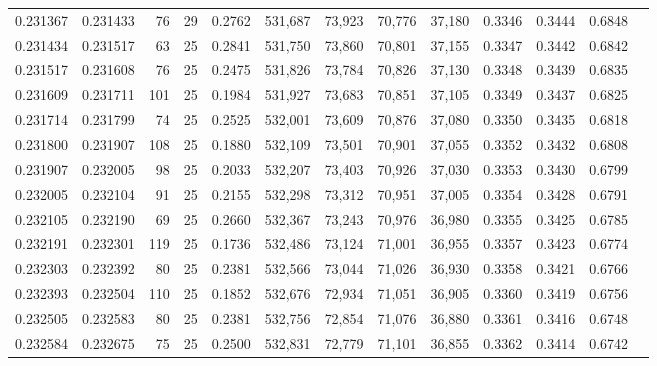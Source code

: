 \begin{tabular}{rrrrrrrrrrrrr}
0.231367 & 0.231433 &    76 &  29 &                                     0.2762 & 531,687 &  73,923 &  70,776 &  37,180 & 0.3346 & 0.3444 & 0.6848 \\
0.231434 & 0.231517 &    63 &  25 &                                     0.2841 & 531,750 &  73,860 &  70,801 &  37,155 & 0.3347 & 0.3442 & 0.6842 \\
0.231517 & 0.231608 &    76 &  25 &                                     0.2475 & 531,826 &  73,784 &  70,826 &  37,130 & 0.3348 & 0.3439 & 0.6835 \\
0.231609 & 0.231711 &   101 &  25 &                                     0.1984 & 531,927 &  73,683 &  70,851 &  37,105 & 0.3349 & 0.3437 & 0.6825 \\
0.231714 & 0.231799 &    74 &  25 &                                     0.2525 & 532,001 &  73,609 &  70,876 &  37,080 & 0.3350 & 0.3435 & 0.6818 \\
0.231800 & 0.231907 &   108 &  25 &                                     0.1880 & 532,109 &  73,501 &  70,901 &  37,055 & 0.3352 & 0.3432 & 0.6808 \\
0.231907 & 0.232005 &    98 &  25 &                                     0.2033 & 532,207 &  73,403 &  70,926 &  37,030 & 0.3353 & 0.3430 & 0.6799 \\
0.232005 & 0.232104 &    91 &  25 &                                     0.2155 & 532,298 &  73,312 &  70,951 &  37,005 & 0.3354 & 0.3428 & 0.6791 \\
0.232105 & 0.232190 &    69 &  25 &                                     0.2660 & 532,367 &  73,243 &  70,976 &  36,980 & 0.3355 & 0.3425 & 0.6785 \\
0.232191 & 0.232301 &   119 &  25 &                                     0.1736 & 532,486 &  73,124 &  71,001 &  36,955 & 0.3357 & 0.3423 & 0.6774 \\
0.232303 & 0.232392 &    80 &  25 &                                     0.2381 & 532,566 &  73,044 &  71,026 &  36,930 & 0.3358 & 0.3421 & 0.6766 \\
0.232393 & 0.232504 &   110 &  25 &                                     0.1852 & 532,676 &  72,934 &  71,051 &  36,905 & 0.3360 & 0.3419 & 0.6756 \\
0.232505 & 0.232583 &    80 &  25 &                                     0.2381 & 532,756 &  72,854 &  71,076 &  36,880 & 0.3361 & 0.3416 & 0.6748 \\
0.232584 & 0.232675 &    75 &  25 &                                     0.2500 & 532,831 &  72,779 &  71,101 &  36,855 & 0.3362 & 0.3414 & 0.6742 \\

\end{tabular}
